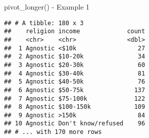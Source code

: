 \documentclass[
  ignorenonframetext,
]{beamer}
\newenvironment{Shaded}{\begin{snugshade}}{\end{snugshade}}
\newcommand{\DataTypeTok}[1]{\textcolor[rgb]{0.13,0.29,0.53}{#1}}
\newcommand{\KeywordTok}[1]{\textcolor[rgb]{0.13,0.29,0.53}{\textbf{#1}}}
\newcommand{\NormalTok}[1]{#1}
\newcommand{\OperatorTok}[1]{\textcolor[rgb]{0.81,0.36,0.00}{\textbf{#1}}}
\newcommand{\StringTok}[1]{\textcolor[rgb]{0.31,0.60,0.02}{#1}}
\begin{document}
\begin{frame}[fragile]{pivot\_longer() - Example 1}
\protect\hypertarget{pivot_longer---example-1-1}{}

\begin{Shaded}
\end{Shaded}

\begin{verbatim}
## # A tibble: 180 x 3
##    religion income             count
##    <chr>    <chr>              <dbl>
##  1 Agnostic <$10k                 27
##  2 Agnostic $10-20k               34
##  3 Agnostic $20-30k               60
##  4 Agnostic $30-40k               81
##  5 Agnostic $40-50k               76
##  6 Agnostic $50-75k              137
##  7 Agnostic $75-100k             122
##  8 Agnostic $100-150k            109
##  9 Agnostic >150k                 84
## 10 Agnostic Don't know/refused    96
## # ... with 170 more rows
\end{verbatim}

\end{frame}
\end{document}
